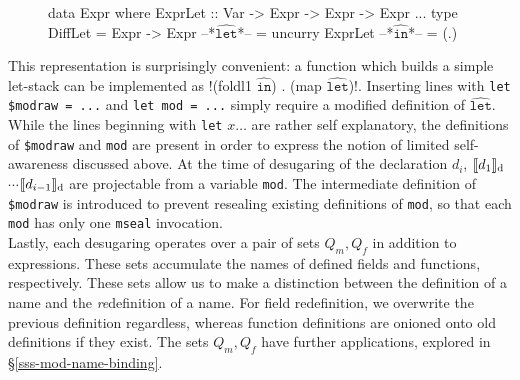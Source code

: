 \documentclass{article}
\newcommand{\diffhat}[1]{\ensuremath{\widehat{\texttt{#1}}}}
\newcommand{\translate}[2]{\ensuremath{\llbracket\texttt{#2}\rrbracket_{\textnormal{#1}}}}
\begin{document}
\begin{figure}[h]
\begin{hscode}
data Expr where
	ExprLet :: Var -> Expr -> Expr -> Expr
	...
type DiffLet = Expr -> Expr
--*\diffhat{let}*-- = uncurry ExprLet
--*\diffhat{in}*-- = (.)
\end{hscode}
\end{figure}

This representation is surprisingly convenient: a function which builds a simple let-stack can be implemented as \hsil!(foldl1 $\diffhat{in}$) . (map $\diffhat{let}$)!. Inserting lines with \texttt{let \$modraw = ...} and \texttt{let mod = ...} simply require a modified definition of \diffhat{let}.\\
\indent While the lines beginning with \texttt{let} $x \ldots$ are rather self explanatory, the definitions of \texttt{\$modraw} and \texttt{mod} are present in order to express the notion of limited self-awareness discussed above. At the time of desugaring of the declaration $d_i$, \translate{d}{$d_1$}$\cdots$\translate{d}{$d_{i-1}$} are projectable from a variable \texttt{mod}. The intermediate definition of \texttt{\$modraw} is introduced to prevent resealing existing definitions of \texttt{mod}, so that each \texttt{mod} has only one \texttt{mseal} invocation.\\
\indent Lastly, each desugaring operates over a pair of sets $Q_m, Q_f$ in addition to expressions. These sets accumulate the names of defined fields and functions, respectively. These sets allow us to make a distinction between the definition of a name and the \emph{re}definition of a name. For field redefinition, we overwrite the previous definition regardless, whereas function definitions are onioned onto old definitions if they exist. The sets $Q_m, Q_f$ have further applications, explored in \S \ref{sss-mod-name-binding}.
\end{document}
